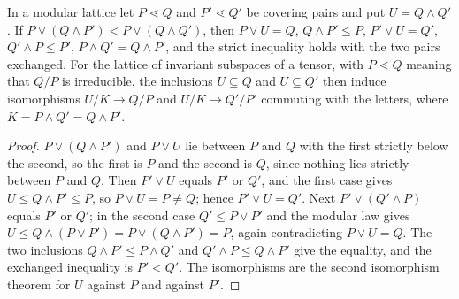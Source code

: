 \begin{lemma}
    \label{lem:asym_uniq_step}
    \leanok
    In a modular lattice let $P\lessdot Q$ and $P'\lessdot Q'$ be covering pairs and put
    $U=Q\wedge Q'$. If $P\vee(Q\wedge P')<P\vee(Q\wedge Q')$, then $P\vee U=Q$, $Q\wedge P'\leq P$,
    $P'\vee U=Q'$, $Q'\wedge P\leq P'$, $P\wedge Q'=Q\wedge P'$, and the strict inequality holds
    with the two pairs exchanged. For the lattice of invariant subspaces of a tensor, with
    $P\lessdot Q$ meaning that $Q/P$ is irreducible, the inclusions $U\subseteq Q$ and
    $U\subseteq Q'$ then induce isomorphisms $U/K\to Q/P$ and $U/K\to Q'/P'$ commuting with the
    letters, where $K=P\wedge Q'=Q\wedge P'$.
\end{lemma}

\begin{proof}
    \leanok
    $P\vee(Q\wedge P')$ and $P\vee U$ lie between $P$ and $Q$ with the first strictly below the
    second, so the first is $P$ and the second is $Q$, since nothing lies strictly between $P$ and
    $Q$. Then $P'\vee U$ equals $P'$ or $Q'$, and the first case gives $U\leq Q\wedge P'\leq P$, so
    $P\vee U=P\neq Q$; hence $P'\vee U=Q'$. Next $P'\vee(Q'\wedge P)$ equals $P'$ or $Q'$; in the
    second case $Q'\leq P\vee P'$ and the modular law gives
    $U\leq Q\wedge(P\vee P')=P\vee(Q\wedge P')=P$, again contradicting $P\vee U=Q$. The two
    inclusions $Q\wedge P'\leq P\wedge Q'$ and $Q'\wedge P\leq Q\wedge P'$ give the equality, and
    the exchanged inequality is $P'<Q'$. The isomorphisms are the second isomorphism theorem for
    $U$ against $P$ and against $P'$.
\end{proof}

